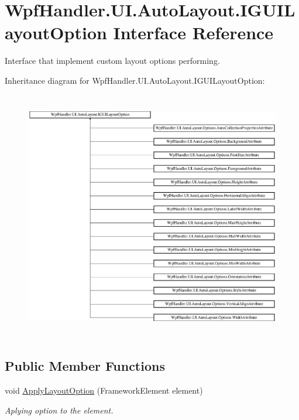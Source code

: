 \hypertarget{interface_wpf_handler_1_1_u_i_1_1_auto_layout_1_1_i_g_u_i_layout_option}{}\section{Wpf\+Handler.\+U\+I.\+Auto\+Layout.\+I\+G\+U\+I\+Layout\+Option Interface Reference}
\label{interface_wpf_handler_1_1_u_i_1_1_auto_layout_1_1_i_g_u_i_layout_option}


Interface that implement custom layout options performing.  


Inheritance diagram for Wpf\+Handler.\+U\+I.\+Auto\+Layout.\+I\+G\+U\+I\+Layout\+Option\+:\begin{figure}[H]
\begin{center}
\leavevmode
\includegraphics[height=10.980392cm]{d0/dfe/interface_wpf_handler_1_1_u_i_1_1_auto_layout_1_1_i_g_u_i_layout_option}
\end{center}
\end{figure}
\subsection*{Public Member Functions}
\begin{DoxyCompactItemize}
\item 
void \mbox{\hyperlink{interface_wpf_handler_1_1_u_i_1_1_auto_layout_1_1_i_g_u_i_layout_option_ac2d2fa8aeaf753b3248381399f991005}{Apply\+Layout\+Option}} (Framework\+Element element)
\begin{DoxyCompactList}\small\item\em Aplying option to the element. \end{DoxyCompactList}\end{DoxyCompactItemize}


